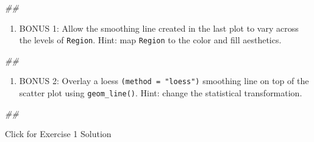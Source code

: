 \documentclass[
]{book}
\newenvironment{Shaded}{\begin{snugshade}}{\end{snugshade}}
\newcommand{\CommentTok}[1]{\textcolor[rgb]{0.56,0.35,0.01}{\textit{#1}}}
\providecommand{\tightlist}{%
  \setlength{\itemsep}{0pt}\setlength{\parskip}{0pt}}
\begin{document}
\begin{Shaded}
\begin{Highlighting}[]
\CommentTok{\#\# }
\end{Highlighting}
\end{Shaded}

\begin{enumerate}
\def\labelenumi{\arabic{enumi}.}
\setcounter{enumi}{4}
\tightlist
\item
  BONUS 1: Allow the smoothing line created in the last plot to vary across the levels of \texttt{Region}. Hint: map \texttt{Region} to the color and fill aesthetics.
\end{enumerate}

\begin{Shaded}
\begin{Highlighting}[]
\CommentTok{\#\# }
\end{Highlighting}
\end{Shaded}

\begin{enumerate}
\def\labelenumi{\arabic{enumi}.}
\setcounter{enumi}{5}
\tightlist
\item
  BONUS 2: Overlay a loess \texttt{(method\ =\ "loess")} smoothing line on top of the scatter plot using \texttt{geom\_line()}. Hint: change the statistical transformation.
\end{enumerate}

\begin{Shaded}
\begin{Highlighting}[]
\CommentTok{\#\# }
\end{Highlighting}
\end{Shaded}

{Click for Exercise 1 Solution}
\end{document}
